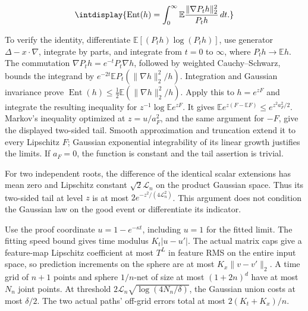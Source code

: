 \begingroup\renewcommand{\theHequation}{intdisplay.472}
\begin{equation*}
\intdisplay{
\operatorname{Ent}(h)=
\int_0^\infty\mathbb E\frac{\|\nabla P_th\|_2^2}{P_th}\,dt.
}
\end{equation*}
\endgroup


To verify the identity, differentiate \(\mathbb E[(P_th)\log(P_th)]\), use generator \(\Delta-x\cdot\nabla\), integrate by parts, and integrate from \(t=0\) to \(\infty\), where \(P_th\to\mathbb Eh\). The commutation \(\nabla P_th=e^{-t}P_t\nabla h\), followed by weighted Cauchy--Schwarz, bounds the integrand by \(e^{-2t}\mathbb EP_t(\|\nabla h\|_2^2/h)\). Integration and Gaussian invariance prove \(\operatorname{Ent}(h)\le\tfrac12\mathbb E(\|\nabla h\|_2^2/h)\). Apply this to \(h=e^{zF}\) and integrate the resulting inequality for \(z^{-1}\log\mathbb Ee^{zF}\). It gives \(\mathbb Ee^{z(F-\mathbb EF)}\le e^{z^2a_F^2/2}\). Markov's inequality optimized at \(z=u/a_F^2\), and the same argument for \(-F\), give the displayed two-sided tail. Smooth approximation and truncation extend it to every Lipschitz \(F\); Gaussian exponential integrability of its linear growth justifies the limits. If \(a_F=0\), the function is constant and the tail assertion is trivial.



For two independent roots, the difference of the identical scalar extensions has mean zero and Lipschitz constant \(\sqrt2\mathcal L_n\) on the product Gaussian space. Thus its two-sided tail at level \(z\) is at most \(2e^{-z^2/(4\mathcal L_n^2)}\). This argument does not condition the Gaussian law on the good event or differentiate its indicator.



Use the proof coordinate \(u=1-e^{-\kappa t}\), including \(u=1\) for the fitted limit. The fitting speed bound gives time modulus \(K_t|u-u'|\). The actual matrix caps give a feature-map Lipschitz coefficient at most \(T^L\) in feature RMS on the entire input space, so prediction increments on the sphere are at most \(K_x\|v-v'\|_2\). A time grid of \(n+1\) points and sphere \(1/n\)-net of size at most \((1+2n)^d\) have at most \(N_n\) joint points. At threshold \(2\mathcal L_n\sqrt{\log(4N_n/\delta)}\), the Gaussian union costs at most \(\delta/2\). The two actual paths' off-grid errors total at most \(2(K_t+K_x)/n\).


